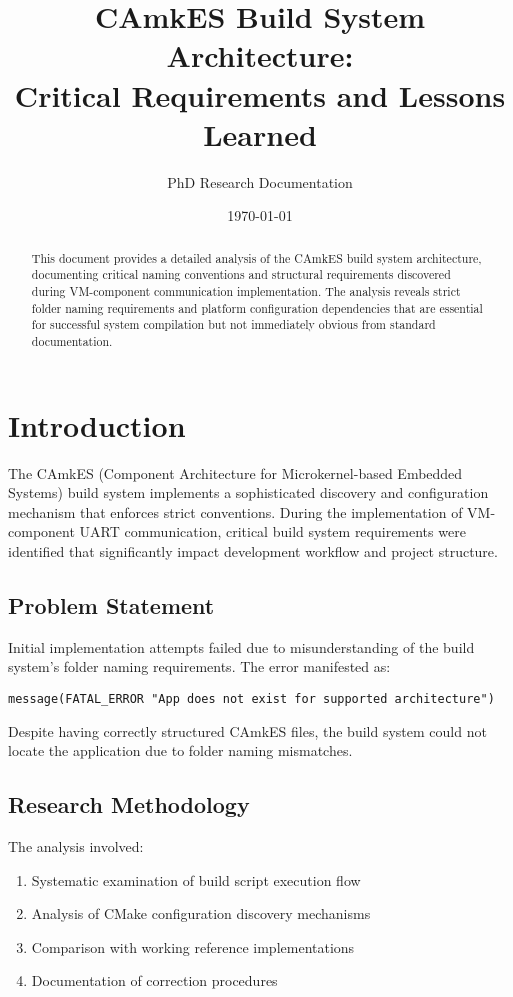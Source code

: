 \documentclass[12pt,a4paper]{article}
\title{CAmkES Build System Architecture:\\
Critical Requirements and Lessons Learned}
\author{PhD Research Documentation}
\date{\today}
\begin{document}
\maketitle

\begin{abstract}
This document provides a detailed analysis of the CAmkES build system architecture, documenting critical naming conventions and structural requirements discovered during VM-component communication implementation. The analysis reveals strict folder naming requirements and platform configuration dependencies that are essential for successful system compilation but not immediately obvious from standard documentation.
\end{abstract}

\tableofcontents
\newpage

\section{Introduction}

The CAmkES (Component Architecture for Microkernel-based Embedded Systems) build system implements a sophisticated discovery and configuration mechanism that enforces strict conventions. During the implementation of VM-component UART communication, critical build system requirements were identified that significantly impact development workflow and project structure.

\subsection{Problem Statement}

Initial implementation attempts failed due to misunderstanding of the build system's folder naming requirements. The error manifested as:

\begin{lstlisting}[style=bash]
message(FATAL_ERROR "App does not exist for supported architecture")
\end{lstlisting}

Despite having correctly structured CAmkES files, the build system could not locate the application due to folder naming mismatches.

\subsection{Research Methodology}

The analysis involved:
\begin{enumerate}
\item Systematic examination of build script execution flow
\item Analysis of CMake configuration discovery mechanisms
\item Comparison with working reference implementations
\item Documentation of correction procedures
\end{enumerate}
\end{document}
